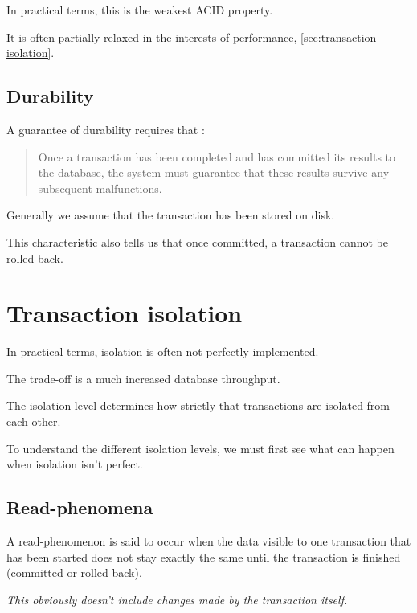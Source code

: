 \documentclass[slides]{pgnotes}
\begin{document}
In practical terms, this is the weakest ACID property.

It is often partially relaxed in the interests of performance, \autoref{sec:transaction-isolation}.

\subsection{Durability} 
\label{sec:durability}

A guarantee of durability requires that \citep{haerder:1983:principles}:
\begin{quotation}
Once a transaction has been completed and has committed its results to the database, the system must guarantee that these results survive any subsequent malfunctions.
\end{quotation}

Generally we assume that the transaction has been stored on disk. 

This characteristic also tells us that once committed, a transaction cannot be rolled back.



\section{Transaction isolation}
\label{sec:transaction-isolation}

In practical terms, isolation is often not perfectly implemented.

The trade-off is a much increased database throughput.

The isolation level determines how strictly that transactions are isolated from each other.

To understand the different isolation levels, we must first see what can happen when isolation isn't perfect.

\subsection{Read-phenomena}

A read-phenomenon is said to occur when the data visible to one transaction that has been started does not stay exactly the same until the transaction is finished (committed or rolled back). 

\textit{This obviously doesn't include changes made by the transaction itself.}
\end{document}

